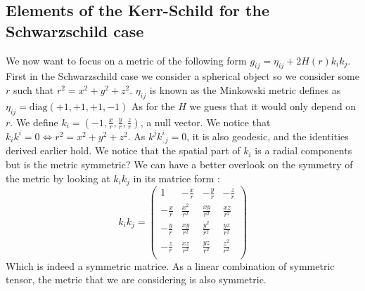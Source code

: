 \documentclass[a4paper,12pt]{article}
\theoremstyle{definition}
\begin{document}
\subsection{Elements of the Kerr-Schild for the Schwarzschild case}
We now want to focus on a metric of the following form $g_{ij}=\eta_{ij}+2H(r)k_ik_j$.
First in the Schwarzschild case we consider a spherical object so we consider some $r$ such that $r^2=x^2+y^2+z^2$.
$\eta_{ij}$ is known as the Minkowski metric defines as $\eta_{ij}=\text{diag}(+1,+1,+1,-1)$
As for the $H$ we guess that it would only depend on $r$.
We define $k_i=(-1,\frac{x}{r},\frac{y}{r},\frac{z}{r})$, a null vector.
We notice that $k_ik^i=0 \Leftrightarrow r^2=x^2+y^2+z^2$.
As $k^jk^i_{,j}=0$, it is also geodesic, and the identities derived earlier hold.
We notice that the spatial part of $k_i$ is a radial components but is the metric symmetric?
We can have a better overlook on the symmetry of the metric by looking at $k_ik_j$ in its matrice form :
\begin{equation}
	k_ik_j=\left(
	\begin{array}{cccc}
	1 & -\frac{x}{r} & -\frac{y}{r} & -\frac{z}{r} \\
	-\frac{x}{r} & \frac{x^2}{r^2} & \frac{x y}{r^2} &
	\frac{x z}{r^2} \\
	-\frac{y}{r} & \frac{x y}{r^2} & \frac{y^2}{r^2} &
	\frac{y z}{r^2} \\
	-\frac{z}{r} & \frac{x z}{r^2} & \frac{y z}{r^2} &
	\frac{z^2}{r^2} \\
	\end{array}
	\right)
\end{equation}
Which is indeed a symmetric matrice.
As a linear combination of symmetric tensor, the metric that we are considering is also symmetric.
\end{document}
